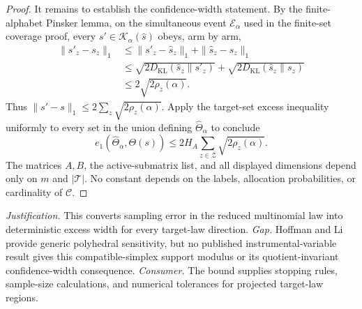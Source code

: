 \documentclass{article}
\begin{document}
\begin{proof}
It remains to establish the confidence-width statement.  By the finite-alphabet Pinsker lemma, on the simultaneous event \(\mathcal E_\alpha\) used in the finite-set coverage proof, every \(s'\in\mathcal K_\alpha(\widehat s)\) obeys, arm by arm,
\[
\begin{aligned}
\|s'_z-s_z\|_1
&\le\|s'_z-\widehat s_z\|_1+\|\widehat s_z-s_z\|_1\\
&\le\sqrt{2D_{\mathrm{KL}}(\widehat s_z\|s'_z)}
 +\sqrt{2D_{\mathrm{KL}}(\widehat s_z\|s_z)}\\
&\le2\sqrt{2\rho_z(\alpha)}.
\end{aligned}
\]
Thus \(\|s'-s\|_1\le2\sum_z\sqrt{2\rho_z(\alpha)}\).  Apply the target-set excess inequality uniformly to every set in the union defining \(\widehat\Theta_\alpha\) to conclude
\[
e_1(\widehat\Theta_\alpha,\Theta(s))
\le2H_A\sum_{z\in\mathcal Z}\sqrt{2\rho_z(\alpha)}.
\]
The matrices \(A,B\), the active-submatrix list, and all displayed dimensions depend only on \(m\) and \(|\mathcal T|\).  No constant depends on the labels, allocation probabilities, or cardinality of \(\mathcal C\).
\end{proof}
\par\smallskip\noindent \textit{Justification.} This converts sampling error in the reduced multinomial law into deterministic excess width for every target-law direction. \textit{Gap.} Hoffman and Li provide generic polyhedral sensitivity, but no published instrumental-variable result gives this compatible-simplex support modulus or its quotient-invariant confidence-width consequence. \textit{Consumer.} The bound supplies stopping rules, sample-size calculations, and numerical tolerances for projected target-law regions.
\end{document}
